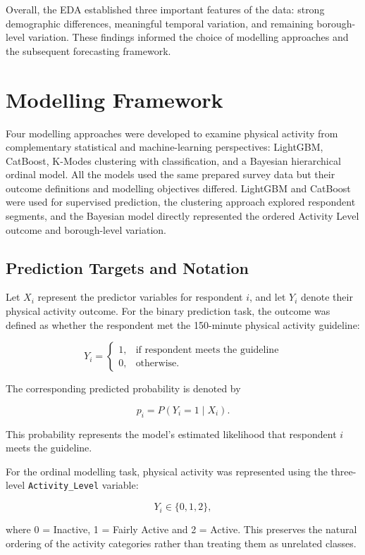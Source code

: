 \documentclass[ %
                    author={Ashrey Ashrey, Sanya Kapoor, Trisha Sharma, Yash Bhooshan Pandloskar},
                supervisor={Dr. Dalila O’Grady},
                    degree={MSc},
                     title={Using machine learning to forecast physical activity participation, volunteering and activity patterns in London},
                  subtitle={},
                      type={},
                      year={2021}]{dissertation}
\begin{document}
Overall, the EDA established three important features of the data: strong demographic differences, meaningful temporal variation, and remaining borough-level variation. These findings informed the choice of modelling approaches and the subsequent forecasting framework.

\FloatBarrier
\section{Modelling Framework}

\noindent
Four modelling approaches were developed to examine physical activity from complementary statistical and machine-learning perspectives: LightGBM, CatBoost, K-Modes clustering with classification, and a Bayesian hierarchical ordinal model. All the models used the same prepared survey data but their outcome definitions and modelling objectives differed. LightGBM and CatBoost were used for supervised prediction, the clustering approach explored respondent segments, and the Bayesian model directly represented the ordered Activity Level outcome and borough-level variation.

\FloatBarrier
\subsection{Prediction Targets and Notation}

\noindent
Let \(X_i\) represent the predictor variables for respondent \(i\), and let \(Y_i\) denote their physical activity outcome. For the binary prediction task, the outcome was defined as whether the respondent met the 150-minute physical activity guideline:

\[
Y_i =
\begin{cases}
1, & \text{if respondent meets the guideline} \\
0, & \text{otherwise}.
\end{cases}
\]

The corresponding predicted probability is denoted by

\[
p_i = P(Y_i = 1 \mid X_i).
\]

This probability represents the model's estimated likelihood that respondent \(i\) meets the guideline.

For the ordinal modelling task, physical activity was represented using the three-level \texttt{Activity\_Level} variable:

\[
Y_i \in \{0,1,2\},
\]

where 0 = Inactive, 1 = Fairly Active and 2 = Active. This preserves the natural ordering of the activity categories rather than treating them as unrelated classes.
\end{document}
